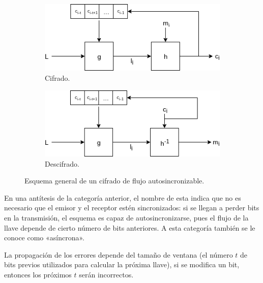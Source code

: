 \begin{figure}[H]
  \centering
  \begin{subfigure}{0.45\textwidth}
    \begin{center}
      \includegraphics[width=0.9\linewidth]
        {contenidos/antecedentes/cifrados_de_flujo/diagramas/asincrono_cifrado.png}
      \caption{Cifrado.}
    \end{center}
  \end{subfigure}
  \begin{subfigure}{0.45\textwidth}
    \begin{center}
      \includegraphics[width=0.9\linewidth]
        {contenidos/antecedentes/cifrados_de_flujo/diagramas/asincrono_descifrado.png}
      \caption{Descifrado.}
    \end{center}
  \end{subfigure}
  \caption{Esquema general de un cifrado de flujo autosincronizable.}
  \label{flujo_asincrono}
\end{figure}

En una antítesis de la categoría anterior, el nombre de esta indica que no es
necesario que el emisor y el receptor estén sincronizados: si se llegan a
perder bits en la transmisión, el esquema es capaz de autosincronizarse, pues
el flujo de la llave depende de cierto número de bits anteriores. A esta
categoría también se le conoce como «asíncrona».

La propagación de los errores depende del tamaño de ventana (el número $ t $
de bits previos utilizados para calcular la próxima llave), si se modifica un
bit, entonces los próximos $ t $ serán incorrectos.
